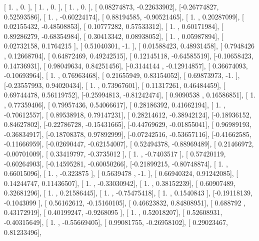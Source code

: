 \documentclass{article}
\begin{document}
       [ 1.        ,  0.        ],
       [ 1.        ,  0.        ],
       [ 1.        ,  0.        ],
       [ 0.08274873, -0.22633902],
       [-0.26774827,  0.52593586],
       [ 1.        , -0.60224174],
       [ 0.88194585, -0.90521465],
       [ 1.        ,  0.20287099],
       [ 0.02155432, -0.48508853],
       [ 0.10777282,  0.57533312],
       [ 1.        ,  0.60171984],
       [ 0.89286279, -0.68354984],
       [ 0.30413342,  0.08938052],
       [ 1.        ,  0.05987894],
       [ 0.02732158,  0.1764215 ],
       [ 0.51040301, -1.        ],
       [ 0.01588423,  0.48931458],
       [ 0.7948426 ,  0.12668704],
       [ 0.64872469,  0.49242515],
       [ 0.12145118, -0.64585519],
       [-0.10658423,  0.14736931],
       [ 0.98049634,  0.84251456],
       [-0.3144144 , -0.12914857],
       [ 0.36674093, -0.10693964],
       [ 1.        ,  0.76963468],
       [ 0.21655949,  0.83154052],
       [ 0.69873973, -1.        ],
       [-0.23557993,  0.94020434],
       [ 1.        ,  0.73967601],
       [ 0.11317261,  0.46484459],
       [ 0.69744478,  0.56119752],
       [-0.25994813, -0.81242474],
       [ 0.9090538 ,  0.16586851],
       [ 1.        ,  0.77359406],
       [ 0.79957436,  0.54066617],
       [ 0.28186392,  0.41662194],
       [ 1.        , -0.70612557],
       [ 0.89538918,  0.79147231],
       [ 0.28214612, -0.38942124],
       [-0.18936152,  0.84627802],
       [-0.22786728, -0.15431665],
       [-0.44769629, -0.01855041],
       [ 0.96989193, -0.36834917],
       [-0.18708378,  0.97892999],
       [-0.07242516, -0.53657116],
       [-0.41662585, -0.11666959],
       [-0.02690447, -0.62154007],
       [ 0.52494378, -0.88969489],
       [ 0.21466972, -0.00701009],
       [ 0.33419797, -0.3735012 ],
       [ 1.        , -0.7403517 ],
       [ 0.57420119, -0.60264903],
       [-0.14595281, -0.60050266],
       [-0.21899215, -0.80748874],
       [ 1.        ,  0.66015096],
       [ 1.        , -0.323875  ],
       [ 0.5639478 , -1.        ],
       [ 0.66940324,  0.91242085],
       [ 0.14244747,  0.11436507],
       [ 1.        , -0.33030942],
       [ 1.        ,  0.38152239],
       [ 0.60907489,  0.32681296],
       [ 1.        ,  0.21586445],
       [ 1.        , -0.75475418],
       [ 1.        ,  0.1540843 ],
       [-0.19118139, -0.1043099 ],
       [ 0.56162612, -0.15160105],
       [ 0.46623832,  0.84808951],
       [ 0.688792  ,  0.43172919],
       [ 0.40199247, -0.9268095 ],
       [ 1.        ,  0.52018207],
       [ 0.52608931, -0.40315649],
       [ 1.        , -0.55669405],
       [ 0.99081755, -0.26958102],
       [ 0.29023467,  0.81233496],
\end{document}
